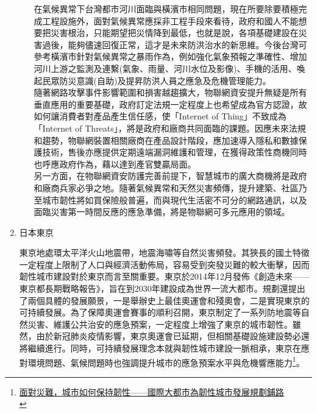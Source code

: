 \documentclass[a4paper,12pt]{article}
\begin{document}
\begin{enumerate}
\begin{enumerate}
在氣候異常下台灣都市河川面臨與橫濱市相同問題，現在所要除要積極完成工程設施外，面對氣候異常應採非工程手段來看待，政府和國人不能想要把災害根治，只能期望把災情降到最低，也就是說，各項基礎建設在災害過後，能夠儘速回復正常，這才是未來防洪治水的新思維。今後台灣可參考橫濱市針對氣候異常之暴雨作為，例如強化氣象預報之準確性、增加河川上游之監測及連繫(氣象、雨量、河川水位及影像)、手機的活用、喚起民眾防災意識(自助)及提昇防洪人員之應急及危機管理能力。\\

隨著網路攻擊事件影響範圍和損害越趨擴大，物聯網資安提升無疑是所有垂直應用的重要基礎，政府訂定法規一定程度上也希望成為官方認證，故如何讓消費者對產品產生信任感，使「Internet of Thing」不致成為「Internet of Threats」，將是政府和廠商共同面臨的課題。因應未來法規和趨勢，物聯網裝置相關廠商在產品設計階段，應加速導入隱私和數據保護技術，售後亦應提供定期遠端漏洞維護和管理，在獲得政策性商機同時也呼應政府作為，藉以達到產官雙贏局面。\\

另一方面，在物聯網資安防護完善前提下，智慧城市的廣大商機將是政府和廠商兵家必爭之地。隨著氣候異常和天然災害頻傳，提升建築、社區乃至城市韌性將如買保險般普遍，而與現代生活密不可分的網路通訊，以及面臨災害第一時間反應的應急準備，將是物聯網可多元應用的領域。\\
\end{enumerate}

\item 日本東京
\label{sec:org08950b7}

東京地處環太平洋火山地震帶，地震海嘯等自然災害頻發。其狹長的國土特徵一定程度上限制了人口與經濟活動佈局，容易受到突發災難的較大衝擊，因而韌性城市建設對於東京而言至關重要。東京於2014年12月發佈《創造未來——東京都長期戰略報告》，旨在到2030年建設成為世界一流大都市。規劃還提出了兩個具體的發展願景，一是舉辦史上最佳奧運會和殘奧會，二是實現東京的可持續發展。為了保障奧運會賽事的順利召開，東京制定了一系列防地震等自然災害、維護公共治安的應急預案，一定程度上增強了東京的城市韌性。雖然，由於新冠肺炎疫情影響，東京奧運會已延期，但相關基礎設施建設勢必還將繼續進行。同時，可持續發展理念本就與韌性城市建設一脈相承，東京在應對環境問題、氣候問題時也強調提升城市的應急預案水平與危機響應能力\footnote{\href{https://news.gmw.cn/2020-04/09/content\_33725150.htm?from=search}{面對災難，城市如何保持韌性——國際大都市為韌性城市發展規劃鋪路}\\\label{org42fe735}}。\\


\end{enumerate}
\end{document}
